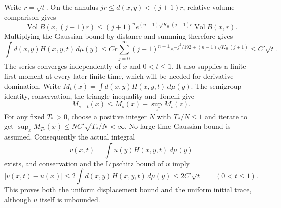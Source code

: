 Write $r=\sqrt t$.  On the annulus $jr\leq d(x,y)<(j+1)r$,
relative volume comparison gives
\[
 \operatorname{Vol}B(x,(j+1)r)
 \leq(j+1)^n e^{(n-1)\sqrt{K_0}(j+1)r}
                                      \operatorname{Vol}B(x,r).
\]
Multiplying the Gaussian bound by distance and summing therefore gives
\[
 \int d(x,y)H(x,y,t)\,d\mu(y)
 \leq Cr\sum_{j=0}^\infty (j+1)^{n+1}
  e^{-j^2/192+(n-1)\sqrt{K_0}(j+1)}\leq C'\sqrt t.
\]
The series converges independently of $x$ and $0<t\leq1$.
It also supplies a finite first moment at every later finite time,
which will be needed for derivative domination.  Write
$M_t(x)=\int d(x,y)H(x,y,t)\,d\mu(y)$.
The semigroup identity, conservation, the triangle inequality and
Tonelli give
\[
 M_{s+t}(x)\leq M_s(x)+\sup_z M_t(z).
\]
For any fixed $T_*>0$, choose a positive integer $N$ with $T_*/N\leq1$
and iterate to get $\sup_xM_{T_*}(x)\leq
NC'\sqrt{T_*/N}<\infty$.  No large-time Gaussian bound is assumed.
Consequently the actual integral
\[
 v(x,t)=\int u(y)H(x,y,t)\,d\mu(y)
\]
exists, and conservation and the Lipschitz bound of $u$ imply
\[
 |v(x,t)-u(x)|\leq2\int d(x,y)H(x,y,t)\,d\mu(y)
                  \leq2C'\sqrt t\qquad(0<t\leq1).
\]
This proves both the uniform displacement bound and the uniform
initial trace, although $u$ itself is unbounded.


